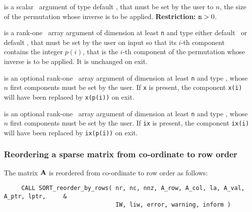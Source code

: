 \documentclass{galahad}
\begin{document}
\begin{description}
 is a scalar \intentin\ argument of type default
\integer, that must be set by the user to $n$, the size of the permutation
whose inverse is to be applied.
{\bf Restriction:} ${\tt n} > 0$.
 
 is a rank-one \intentinout\ array argument of
dimension at least {\tt n} and type either default
\integer\ or default \realdp, that must be set by the user 
on input so that its $i$-th component contains the integer $p(i)$, that is the
$i$-th component of the permutation whose inverse is to be applied.
It is unchanged on exit.

 is an optional rank-one \intentinout\ array argument of
dimension at least {\tt n} and type \realdp, whose $n$ first components must
be set by the user. If {\tt x} is present, the component {\tt x(i)} will have
been replaced by {\tt x(p(i))} on exit.

 is an optional rank-one \intentinout\ array argument of
dimension at least {\tt n} and type \integer, whose $n$ first components must
be set by the user. If {\tt ix} is present, the component {\tt ix(i)} will have
been replaced by {\tt ix(p(i))} on exit.
\end{description}

\subsubsection{Reordering a sparse matrix from co-ordinate to row order}

The matrix ${\mathbf{A}}$ is reordered from co-ordinate to row order as follows:
\hskip0.5in 
\def\baselinestretch{1.0} {\tt \begin{verbatim}
     CALL SORT_reorder_by_rows( nr, nc, nnz, A_row, A_col, la, A_val,  A_ptr, lptr,     &
                                IW, liw, error, warning, inform )
\end{verbatim}}
\def\baselinestretch{1.0}
\end{document}
